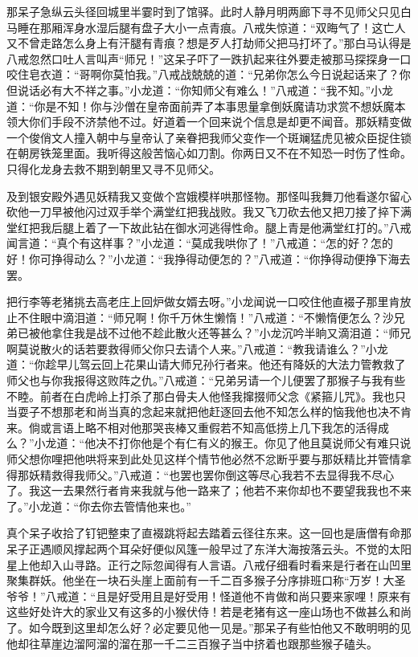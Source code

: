 \documentclass[12pt,UTF8]{ctexbook}
\begin{document}
那呆子急纵云头径回城里半霎时到了馆驿。此时人静月明两廊下寻不见师父只见白马睡在那厢浑身水湿后腿有盘子大小一点青痕。八戒失惊道：“双晦气了！这亡人又不曾走路怎么身上有汗腿有青痕？想是歹人打劫师父把马打坏了。”那白马认得是八戒忽然口吐人言叫声“师兄！”这呆子吓了一跌扒起来往外要走被那马探探身一口咬住皂衣道：“哥啊你莫怕我。”八戒战兢兢的道：“兄弟你怎么今日说起话来了？你但说话必有大不祥之事。”小龙道：“你知师父有难么！”八戒道：“我不知。”小龙道：“你是不知！你与沙僧在皇帝面前弄了本事思量拿倒妖魔请功求赏不想妖魔本领大你们手段不济禁他不过。好道着一个回来说个信息是却更不闻音。那妖精变做一个俊俏文人撞入朝中与皇帝认了亲眷把我师父变作一个斑斓猛虎见被众臣捉住锁在朝房铁笼里面。我听得这般苦恼心如刀割。你两日又不在不知恐一时伤了性命。只得化龙身去救不期到朝里又寻不见师父。

及到银安殿外遇见妖精我又变做个宫娥模样哄那怪物。那怪叫我舞刀他看遂尔留心砍他一刀早被他闪过双手举个满堂红把我战败。我又飞刀砍去他又把刀接了捽下满堂红把我后腿上着了一下故此钻在御水河逃得性命。腿上青是他满堂红打的。”八戒闻言道：“真个有这样事？”小龙道：“莫成我哄你了！”八戒道：“怎的好？怎的好！你可挣得动么？”小龙道：“我挣得动便怎的？”八戒道：“你挣得动便挣下海去罢。

把行李等老猪挑去高老庄上回炉做女婿去呀。”小龙闻说一口咬住他直裰子那里肯放止不住眼中滴泪道：“师兄啊！你千万休生懒惰！”八戒道：“不懒惰便怎么？沙兄弟已被他拿住我是战不过他不趁此散火还等甚么？”小龙沉吟半晌又滴泪道：“师兄啊莫说散火的话若要救得师父你只去请个人来。”八戒道：“教我请谁么？”小龙道：“你趁早儿驾云回上花果山请大师兄孙行者来。他还有降妖的大法力管教救了师父也与你我报得这败阵之仇。”八戒道：“兄弟另请一个儿便罢了那猴子与我有些不睦。前者在白虎岭上打杀了那白骨夫人他怪我撺掇师父念《紧箍儿咒》。我也只当耍子不想那老和尚当真的念起来就把他赶逐回去他不知怎么样的恼我他也决不肯来。倘或言语上略不相对他那哭丧棒又重假若不知高低捞上几下我怎的活得成么？”小龙道：“他决不打你他是个有仁有义的猴王。你见了他且莫说师父有难只说师父想你哩把他哄将来到此处见这样个情节他必然不忿断乎要与那妖精比并管情拿得那妖精救得我师父。”八戒道：“也罢也罢你倒这等尽心我若不去显得我不尽心了。我这一去果然行者肯来我就与他一路来了；他若不来你却也不要望我我也不来了。”小龙道：“你去你去管情他来也。”

真个呆子收拾了钉钯整束了直裰跳将起去踏着云径往东来。这一回也是唐僧有命那呆子正遇顺风撑起两个耳朵好便似风篷一般早过了东洋大海按落云头。不觉的太阳星上他却入山寻路。正行之际忽闻得有人言语。八戒仔细看时看来是行者在山凹里聚集群妖。他坐在一块石头崖上面前有一千二百多猴子分序排班口称“万岁！大圣爷爷！”八戒道：“且是好受用且是好受用！怪道他不肯做和尚只要来家哩！原来有这些好处许大的家业又有这多的小猴伏侍！若是老猪有这一座山场也不做甚么和尚了。如今既到这里却怎么好？必定要见他一见是。”那呆子有些怕他又不敢明明的见他却往草崖边溜阿溜的溜在那一千二三百猴子当中挤着也跟那些猴子磕头。
\end{document}
